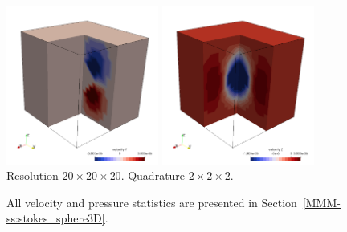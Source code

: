 \begin{center}
\includegraphics[width=5cm]{python_codes/fieldstone_82/RESULTS/bench3/v.png}
\includegraphics[width=5cm]{python_codes/fieldstone_82/RESULTS/bench3/w.png}\\
{\captionfont Resolution $20\times 20\times 20$. Quadrature $2\times 2 \times 2$.} 
\end{center}

All velocity and pressure statistics are presented in Section~\ref{MMM-ss:stokes_sphere3D}.

